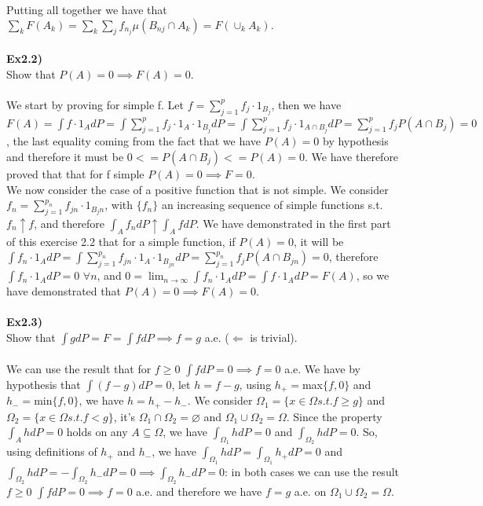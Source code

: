\documentclass[12pt,mythesisstyle]{report}
\begin{document}
\begin{enumerate}
Putting all together we have that $\sum_k F(A_k)=\sum_k\sum_j f_{n_j}\mu(B_{nj} \cap {A_k})=F(\cup_k A_k).$
\\\\
\textbf{Ex2.2)}\\
Show that $P(A)=0\implies F(A)=0$.
\\
\\We start by proving for simple f. Let $f=\sum_{j=1}^p f_j\cdot 1_{B_j}$, then we have $F(A)=\int f\cdot 1_{A}dP=\int \sum_{j=1}^p f_j\cdot 1_A\cdot 1_{B_j}dP=\int \sum_{j=1}^p f_j\cdot 1_{A\cap B_j}dP=\sum_{j=1}^p f_jP(A\cap B_j)=0$, the last equality coming from the fact that we have $P(A)=0$ by hypothesis and therefore it must be $0<=P(A\cap B_j)<=P(A)=0$. We have therefore proved that that for f simple $P(A)=0\implies F=0$.
\\We now consider the case of a positive function that is not simple. We consider $f_n=\sum_{j=1}^{p_n} f_{jn}\cdot 1_{B_jn}$, with $\{f_n\}$ an increasing sequence of simple functions s.t. $f_n\uparrow f$, and therefore $\int_A f_ndP\uparrow\int_A fdP$. We have demonstrated in the first part of this exercise 2.2 that for a simple function, if $P(A)=0$, it will be $\int f_n\cdot 1_{A}dP=\int \sum_{j=1}^{p_n} f_{jn}\cdot 1_A\cdot 1_{B_{jn}}dP=\sum_{j=1}^{p_n} f_jP(A\cap B_{jn})=0$, therefore $\int f_n\cdot 1_{A}dP=0$ $\forall n$, and $0=\lim_{n \to \infty}\int f_n\cdot 1_{A}dP=\int f\cdot 1_{A}dP=F(A)$, so we have demonstrated that $P(A)=0\implies F(A)=0$.
\\\\
\textbf{Ex2.3)}\\
Show that $\int gdP=F=\int fdP\implies f=g$ a.e. ($\Longleftarrow$ is trivial).
\\\\
We can use the result that for $f\geq 0$ $\int fdP=0 \implies f=0$ a.e. We have by hypothesis that $\int (f-g)dP=0$, let $h=f-g$, using $h_+=$max$\{f,0\}$ and $h_-=$min$\{f,0\}$, we have $h=h_+-h_-$. We consider $\Omega_1=\{x\in\Omega s.t. f\geq g\}$ and $\Omega_2=\{x\in\Omega s.t. f<g\}$, it's $\Omega_1\cap\Omega_2=\varnothing$ and $\Omega_1\cup\Omega_2=\Omega$. Since the property $\int_A hdP=0$ holds on any $A\subseteq\Omega$, we have $\int_{\Omega_1} hdP=0$ and $\int_{\Omega_2} hdP=0$. So, using definitions of $h_+$ and $h_-$, we have $\int_{\Omega_1} hdP=\int_{\Omega_1} h_+dP=0$ and $\int_{\Omega_2} hdP=-\int_{\Omega_2} h_-dP=0\implies\int_{\Omega_2} h_-dP=0$: in both cases we can use the result $f\geq 0$ $\int fdP=0 \implies f=0$ a.e. and therefore we have $f=g$ a.e. on $\Omega_1\cup\Omega_2=\Omega$.

\end{enumerate}
\end{document}
